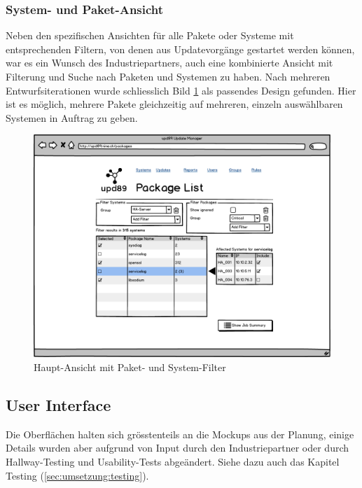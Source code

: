 \subsubsection*{System- und Paket-Ansicht}

Neben den spezifischen Ansichten für alle Pakete oder Systeme mit entsprechenden Filtern, von denen aus Updatevorgänge gestartet werden können, war es ein Wunsch des Industriepartners, auch eine kombinierte Ansicht mit Filterung und Suche nach Paketen und Systemen zu haben. Nach mehreren Entwurfsiterationen wurde schliesslich Bild \ref{fig:design:combo_view_mockup} als passendes Design gefunden. Hier ist es möglich, mehrere Pakete gleichzeitig auf mehreren, einzeln auswählbaren Systemen in Auftrag zu geben.

\begin{figure}[H]
	\centering
	\includegraphics[width=\linewidth]{files/mockups/combo_view}
	\caption{Haupt-Ansicht mit Paket- und System-Filter}
	\label{fig:design:combo_view_mockup}
\end{figure}

\subsection*{User Interface}

Die Oberflächen halten sich grösstenteils an die Mockups aus der Planung, einige Details wurden aber aufgrund von Input durch den Industriepartner oder durch Hallway-Testing und Usability-Tests abgeändert. Siehe dazu auch das Kapitel Testing (\ref{sec:umsetzung:testing}).


